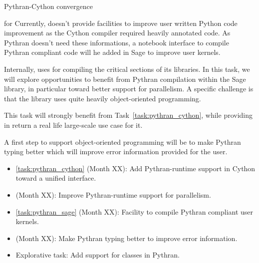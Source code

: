 \begin{Workpackage}{\thewpno}
\begin{task}{Pythran-Cython convergence}
\end{task}

\begin{task}{\Pythran for \Sage}
  \label{task:pythran_sage}
  Currently, \Sage doesn't provide facilities to improve user written Python
  code improvement as the Cython compiler required heavily annotated code. As
  Pythran doesn't need these informations, a notebook interface to compile Pythran
  compliant code will he added in Sage to improve user kernels.

  Internally, \Sage uses \Cython for compiling the critical sections of
  its libraries. In this task, we will explore opportunities to
  benefit from Pythran compilation within the Sage library, in
  particular toward better support for parallelism. A specific
  challenge is that the \Sage library uses quite heavily
  object-oriented programming.

  This task will strongly benefit from Task~\ref{task:pythran_cython},
  while providing in return a real life large-scale use case for it.

  A first step to support object-oriented programming will be to make Pythran
  typing better which will improve error information provided for the user.
\end{task}


\begin{WPDeliverables}
    \begin{itemize}
\item
\ref{task:pythran_cython}
(Month XX):
Add Pythran-runtime support in Cython toward a unified interface.
\item
(Month XX):
Improve Pythran-runtime support for parallelism.
\item
\ref{task:pythran_sage}
(Month XX):
Facility to compile Pythran compliant user kernels.
\item
(Month XX):
Make Pythran typing better to improve error information.
\item
Explorative task:
Add support for classes in Pythran.
\end{itemize}
\end{WPDeliverables}
\end{Workpackage}

